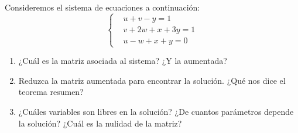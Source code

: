 \documentclass[12pt]{article}
\theoremstyle{plain}
\theoremstyle{definition}
\theoremstyle{remark}
\renewcommand{\:}{\colon}           %
\begin{document}
\begin{multicols}{2}
\begin{ptcbP}
  Consideremos el sistema de ecuaciones a continuación:
  $$
  \left\lbrace\begin{aligned}
    &u+v-y=1\\
    &v+2w+x+3y=1\\
    &u-w+x+y=0
              \end{aligned}\right.
  $$
  \begin{enumerate}
    \item ¿Cuál es la matriz asociada al sistema? ¿Y la aumentada?
    \item Reduzca la matriz aumentada para encontrar la solución. ¿Qué nos dice el teorema resumen?
    \item ¿Cuáles variables son libres en la solución? ¿De cuantos parámetros depende la solución? ¿Cuál es la nulidad de la matriz?
  \end{enumerate}
\end{ptcbP}
\end{multicols}
\end{document}
